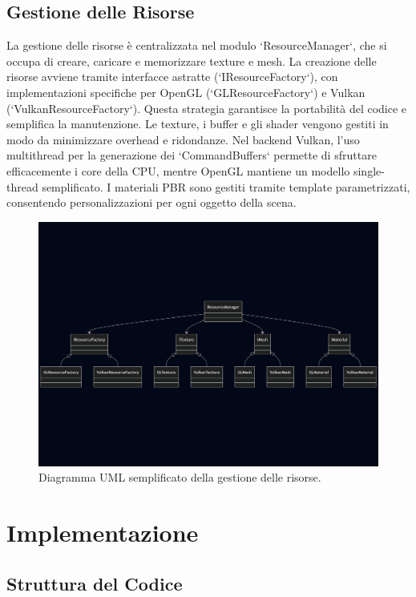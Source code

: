 \documentclass[12pt,a4paper,openright,twoside]{book}
\begin{document}
\section{Gestione delle Risorse}
La gestione delle risorse è centralizzata nel modulo `ResourceManager`, che si occupa di creare, caricare e memorizzare
texture e mesh. La creazione delle risorse avviene tramite interfacce astratte (`IResourceFactory`), con implementazioni
specifiche per OpenGL (`GLResourceFactory`) e Vulkan (`VulkanResourceFactory`). Questa strategia garantisce la portabilità
del codice e semplifica la manutenzione. Le texture, i buffer e gli shader vengono gestiti in modo da minimizzare
overhead e ridondanze. Nel backend Vulkan, l'uso multithread per la generazione dei `CommandBuffers` permette di
sfruttare efficacemente i core della CPU, mentre OpenGL mantiene un modello single-thread semplificato. I materiali PBR
sono gestiti tramite template parametrizzati, consentendo personalizzazioni per ogni oggetto della scena.
\begin{figure}[H]
    \centering
    \includegraphics[width=.8\linewidth]{figures/uml_resources.png}
    \caption{Diagramma UML semplificato della gestione delle risorse.}
    \label{fig:uml-resources}
\end{figure}

\chapter{Implementazione}
\label{chap:implementazione}

\section{Struttura del Codice}
\end{document}
